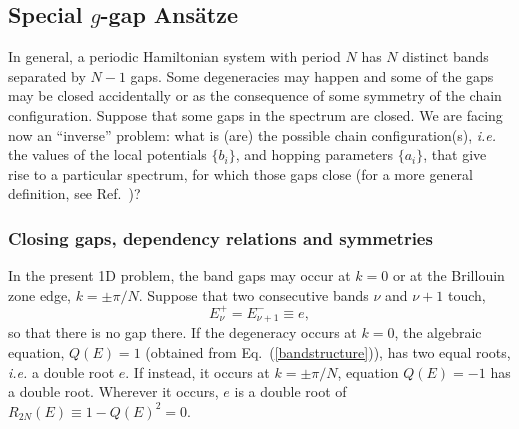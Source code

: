\documentclass[]{revtex4-1}
\begin{document}
\subsection{Special $g$-gap Ans\"atze}
\label{specialcase}
In general, a periodic Hamiltonian system with period $N$ has $N$ distinct bands separated by $N-1$ gaps. Some degeneracies may happen and some of the gaps may be closed accidentally or as the consequence of some symmetry of the chain configuration. Suppose that some gaps in the spectrum are closed. 
We are facing now an ``inverse'' problem: what is (are) the possible chain configuration(s), \textit{i.e.} the values of the local potentials $\{b_i\}$, and hopping parameters $\{a_i\}$, that give rise to a particular spectrum, for which those gaps close (for a more general definition, see Ref.~\cite{Kac})?

\subsubsection{Closing gaps, dependency relations and symmetries}
\label{dependency}

In the present 1D problem, the band gaps may occur at $k=0$ or at the Brillouin zone edge, $k=\pm \pi/N$.
Suppose that two consecutive bands $\nu$ and $\nu+1$ touch, \begin{equation} E_{\nu}^+=E_{\nu+1}^- \equiv e, \end{equation} so that there is no gap there. If the degeneracy occurs at $k=0$, the algebraic equation, $Q(E)=1$ (obtained from Eq.~(\ref{bandstructure})), has two equal roots, \textit{i.e.} a double root $e$. If instead, it occurs at $k=\pm \pi/N$, equation $Q(E)=-1$ has a double root.  Wherever it occurs, $e$ is a double root of $R_{2N}(E)\equiv 1-Q(E)^2=0$.
\end{document}
